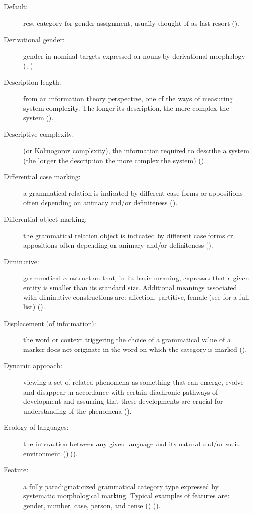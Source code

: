 \documentclass[output=collectionpaper]{langsci/langscibook}
\begin{document}
{\begin{description}
\item  [Default:] rest category for gender assignment, usually thought of as last resort ().
\item  [Derivational gender:] gender in nominal targets expressed on nouns by derivational morphology (, ).
\item  [Description length:] from an information theory perspective, one of the ways of measuring system complexity. The longer its description, the more complex the system ().
\item  [Descriptive complexity:] (or Kolmogorov complexity), the information required to describe a system (the longer the description the more complex the system) ().
\item  [Differential case marking:] a grammatical relation is indicated by different case forms or appositions often depending on animacy and/or definiteness ().
\item  [Differential object marking:] the grammatical relation object is indicated by different case forms or appositions often depending on animacy and/or definiteness ().
\item  [Diminutive:] grammatical construction that, in its basic meaning, expresses that a given entity is smaller than its standard size. Additional meanings associated with diminutive constructions are: affection, partitive, female (see \citealt{Jurafsky1996} for a full list) ().
\item  [Displacement (of information):] the word or context triggering the choice of a grammatical value of a marker does not originate in the word on which the category is marked ().
\item  [Dynamic approach:] viewing a set of related phenomena as something that can emerge, evolve and disappear in accordance with certain diachronic pathways of development and assuming that these developments are crucial for understanding of the phenomena ().
\item  [Ecology of languages:] the interaction between any given language and its natural and/or social environment (\citealt{Haugen1972}) ().
\item  [Feature:] a fully paradigmaticized grammatical category type expressed by systematic morphological marking. Typical examples of features are: gender, number, case, person, and tense (\citealt{Corbett2012}) ().

\end{description}}
\end{document}
